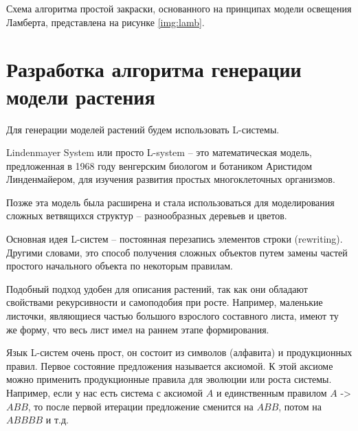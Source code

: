 Схема алгоритма простой закраски, основанного на принципах
модели освещения Ламберта, представлена на рисунке \ref{img:lamb}.


\section{Разработка алгоритма генерации модели растения}

Для генерации моделей растений будем использовать L-системы.

Lindenmayer System или просто L-system \cite{l-systems} – это математическая модель, предложенная в 1968 году венгерским биологом и ботаником Аристидом
Линденмайером, для изучения развития простых многоклеточных организмов.

Позже эта модель была расширена и стала использоваться для моделирования сложных ветвящихся структур – разнообразных деревьев и цветов.

Основная идея L-систем – постоянная перезапись элементов строки (rewriting). Другими словами, это способ получения сложных объектов путем замены частей простого начального объекта по некоторым правилам. 

Подобный подход удобен для описания растений, так как они обладают свойствами рекурсивности и самоподобия при росте. Например, маленькие листочки, являющиеся частью большого взрослого составного листа, имеют ту же форму, что весь лист имел на раннем этапе формирования.

Язык L-систем очень прост, он состоит из символов (алфавита) и
продукционных правил. Первое состояние предложения называется аксиомой.
К этой аксиоме можно применить продукционные правила для эволюции или
роста системы. Например, если у нас есть система с аксиомой $A$ и единственным
правилом $A$ -> $ABB$, то после первой итерации предложение сменится на $ABB$,
потом на $ABBBB$ и т.д.

